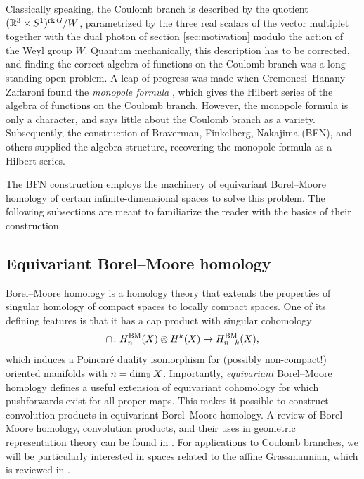 Classically speaking, the Coulomb branch is described by the quotient $(\mathbb{R}^3 \times S^1)^{\operatorname{rk} G}/W$, parametrized by the three real scalars of the vector multiplet together with the dual photon of section \ref{sec:motivation} modulo the action of the Weyl group $W$. Quantum mechanically, this description has to be corrected, and finding the correct algebra of functions on the Coulomb branch was a long-standing open problem. A leap of progress was made when Cremonesi--Hanany--Zaffaroni found the \emph{monopole formula} \cite{cremonesi_monopole_2014}, which gives the Hilbert series of the algebra of functions on the Coulomb branch. However, the monopole formula is only a character, and says little about the Coulomb branch as a variety. Subsequently, the construction of Braverman, Finkelberg, Nakajima (BFN), and others supplied the algebra structure, recovering the monopole formula as a Hilbert series.

The BFN construction employs the machinery of equivariant Borel--Moore homology of certain infinite-dimensional spaces to solve this problem. The following subsections are meant to familiarize the reader with the basics of their construction.

\subsection{Equivariant Borel--Moore homology}

Borel--Moore homology \cite{borel_homology_1960} is a homology theory that extends the properties of singular homology of compact spaces to locally compact spaces. One of its defining features is that it has a cap product with singular cohomology
\begin{equation}
	\cap \colon H_n^\textup{BM}(X) \otimes H^k(X) \to H_{n-k}^\textup{BM}(X),
\end{equation}
which induces a Poincaré duality isomorphism for (possibly non-compact!) oriented manifolds with $n = \dim_{\mathbb{R}} X$. Importantly, \emph{equivariant} Borel--Moore homology \cite{anderson_equivariant_2023} defines a useful extension of equivariant cohomology for which pushforwards exist for all proper maps. This makes it possible to construct convolution products in equivariant Borel--Moore homology. A review of Borel--Moore homology, convolution products, and their uses in geometric representation theory can be found in \cite{ginzburg_geometric_1998}. For applications to Coulomb branches, we will be particularly interested in spaces related to the affine Grassmannian, which is reviewed in \cite{zhu_introduction_2016}.

